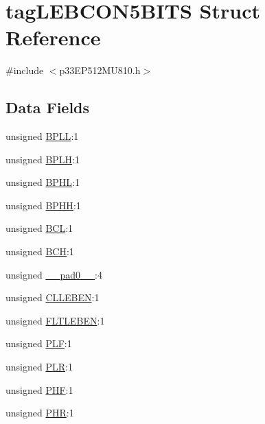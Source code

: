 \hypertarget{structtag_l_e_b_c_o_n5_b_i_t_s}{}\section{tag\+L\+E\+B\+C\+O\+N5\+B\+I\+TS Struct Reference}
\label{structtag_l_e_b_c_o_n5_b_i_t_s}


{\ttfamily \#include $<$p33\+E\+P512\+M\+U810.\+h$>$}

\subsection*{Data Fields}
\begin{DoxyCompactItemize}
\item 
unsigned \hyperlink{structtag_l_e_b_c_o_n5_b_i_t_s_a734b807d032fa494468c04783b84279d}{B\+P\+LL}\+:1
\item 
unsigned \hyperlink{structtag_l_e_b_c_o_n5_b_i_t_s_ab92bd28ed3161199870cae9dca9d8264}{B\+P\+LH}\+:1
\item 
unsigned \hyperlink{structtag_l_e_b_c_o_n5_b_i_t_s_ab1b78e048d280a836358a465b1670e7a}{B\+P\+HL}\+:1
\item 
unsigned \hyperlink{structtag_l_e_b_c_o_n5_b_i_t_s_a8fd804263987e931f779f124751138e1}{B\+P\+HH}\+:1
\item 
unsigned \hyperlink{structtag_l_e_b_c_o_n5_b_i_t_s_acead45594aa9d4a55a37f37fdcc3f0a0}{B\+CL}\+:1
\item 
unsigned \hyperlink{structtag_l_e_b_c_o_n5_b_i_t_s_a485d688549b456635ec3ac860ad7cdaf}{B\+CH}\+:1
\item 
unsigned \hyperlink{structtag_l_e_b_c_o_n5_b_i_t_s_adf71f3d8410c1f1dbbc96680a92c49af}{\+\_\+\+\_\+pad0\+\_\+\+\_\+}\+:4
\item 
unsigned \hyperlink{structtag_l_e_b_c_o_n5_b_i_t_s_a4ec62ac7ec38a6cf1ca2276db69912a9}{C\+L\+L\+E\+B\+EN}\+:1
\item 
unsigned \hyperlink{structtag_l_e_b_c_o_n5_b_i_t_s_aa96ca2430a7a6200927f390d1aa0b21a}{F\+L\+T\+L\+E\+B\+EN}\+:1
\item 
unsigned \hyperlink{structtag_l_e_b_c_o_n5_b_i_t_s_ab72be8b35e01107182afb8e9733d72bb}{P\+LF}\+:1
\item 
unsigned \hyperlink{structtag_l_e_b_c_o_n5_b_i_t_s_a5f690459b53fc81b46dbbac226cecb25}{P\+LR}\+:1
\item 
unsigned \hyperlink{structtag_l_e_b_c_o_n5_b_i_t_s_a4ac425e6c1575269dfa33a0373584fff}{P\+HF}\+:1
\item 
unsigned \hyperlink{structtag_l_e_b_c_o_n5_b_i_t_s_ae02a9c6926c3a1feac21cec18a520e4a}{P\+HR}\+:1
\end{DoxyCompactItemize}


